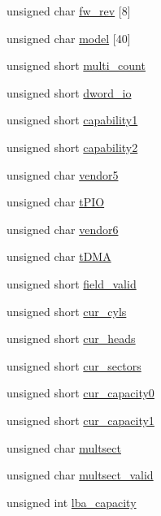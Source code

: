 \begin{DoxyCompactItemize}
\item 
unsigned char \hyperlink{structSATA__ident_a083cc6c6f2a7728709aff9726f8c6913}{fw\+\_\+rev} \mbox{[}8\mbox{]}
\item 
unsigned char \hyperlink{structSATA__ident_a2a36d687174ca2eebc0587eb0882e89f}{model} \mbox{[}40\mbox{]}
\item 
unsigned short \hyperlink{structSATA__ident_ae4fad74cecade33dc2e3e24756eba3d6}{multi\+\_\+count}
\item 
unsigned short \hyperlink{structSATA__ident_a7399191120ad754a14ea722897e7d29a}{dword\+\_\+io}
\item 
unsigned short \hyperlink{structSATA__ident_a31f63a30e501d36ba2f2c5ccf573a51e}{capability1}
\item 
unsigned short \hyperlink{structSATA__ident_a0dffaaa0f1a60b51faf00a3ca2c993ac}{capability2}
\item 
unsigned char \hyperlink{structSATA__ident_ab565f3b27395b9d783a6c1a5752c1090}{vendor5}
\item 
unsigned char \hyperlink{structSATA__ident_abf328a06ef3d38cbde3b259c09504510}{t\+P\+IO}
\item 
unsigned char \hyperlink{structSATA__ident_ab39d63c6a76245c7b33ae8bdf0928859}{vendor6}
\item 
unsigned char \hyperlink{structSATA__ident_af4ac3e7711b35ed8bc6989d23d914b36}{t\+D\+MA}
\item 
unsigned short \hyperlink{structSATA__ident_a608cd51a438131e344a202ffc559c9b6}{field\+\_\+valid}
\item 
unsigned short \hyperlink{structSATA__ident_a5e404662579618edbd9f77571365a993}{cur\+\_\+cyls}
\item 
unsigned short \hyperlink{structSATA__ident_a1fe29be2e7d4c125e53a63297e7d6041}{cur\+\_\+heads}
\item 
unsigned short \hyperlink{structSATA__ident_add99ae85cb8e599a0344fbc72787c707}{cur\+\_\+sectors}
\item 
unsigned short \hyperlink{structSATA__ident_af99cde338deece51a862fd3df0732d16}{cur\+\_\+capacity0}
\item 
unsigned short \hyperlink{structSATA__ident_ae00faf5e261fb84c826a7862c255e6c2}{cur\+\_\+capacity1}
\item 
unsigned char \hyperlink{structSATA__ident_ab259130c7d5a5032eabf063e63a823e8}{multsect}
\item 
unsigned char \hyperlink{structSATA__ident_a4b96a867298b90fe2bc53cb295b8eaf6}{multsect\+\_\+valid}
\item 
unsigned int \hyperlink{structSATA__ident_acd8bcb50bbcde8afa6b790e733569563}{lba\+\_\+capacity}

\end{DoxyCompactItemize}
